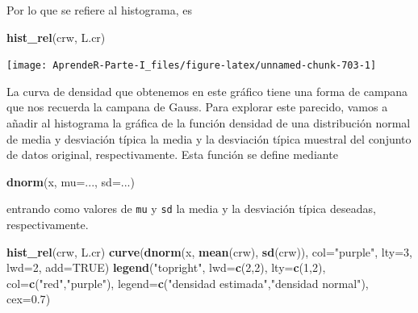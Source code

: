 \documentclass[]{book}
\newenvironment{Shaded}{\begin{snugshade}}{\end{snugshade}}
\newcommand{\DataTypeTok}[1]{\textcolor[rgb]{0.13,0.29,0.53}{#1}}
\newcommand{\DecValTok}[1]{\textcolor[rgb]{0.00,0.00,0.81}{#1}}
\newcommand{\FloatTok}[1]{\textcolor[rgb]{0.00,0.00,0.81}{#1}}
\newcommand{\KeywordTok}[1]{\textcolor[rgb]{0.13,0.29,0.53}{\textbf{#1}}}
\newcommand{\NormalTok}[1]{#1}
\newcommand{\OtherTok}[1]{\textcolor[rgb]{0.56,0.35,0.01}{#1}}
\newcommand{\StringTok}[1]{\textcolor[rgb]{0.31,0.60,0.02}{#1}}
\theoremstyle{definition}
\theoremstyle{definition}
\theoremstyle{definition}
\theoremstyle{remark}
\begin{document}
Por lo que se refiere al histograma, es

\begin{Shaded}
\begin{Highlighting}[]
\KeywordTok{hist_rel}\NormalTok{(crw, L.cr)}
\end{Highlighting}
\end{Shaded}

\begin{center}\texttt{[image: AprendeR-Parte-I\_files/figure-latex/unnamed-chunk-703-1]} \end{center}

La curva de densidad que obtenemos en este gráfico tiene una forma de campana que nos recuerda la campana de Gauss. Para explorar este parecido, vamos a añadir al histograma la gráfica de la función densidad de una distribución normal de media y desviación típica la media y la desviación típica muestral del conjunto de datos original, respectivamente. Esta función se define mediante

\begin{Shaded}
\begin{Highlighting}[]
\KeywordTok{dnorm}\NormalTok{(x, }\DataTypeTok{mu=}\NormalTok{..., }\DataTypeTok{sd=}\NormalTok{...)}
\end{Highlighting}
\end{Shaded}

entrando como valores de \texttt{mu} y \texttt{sd} la media y la desviación típica deseadas, respectivamente.

\begin{Shaded}
\begin{Highlighting}[]
\KeywordTok{hist_rel}\NormalTok{(crw, L.cr)}
\KeywordTok{curve}\NormalTok{(}\KeywordTok{dnorm}\NormalTok{(x, }\KeywordTok{mean}\NormalTok{(crw), }\KeywordTok{sd}\NormalTok{(crw)), }\DataTypeTok{col=}\StringTok{"purple"}\NormalTok{, }\DataTypeTok{lty=}\DecValTok{3}\NormalTok{, }\DataTypeTok{lwd=}\DecValTok{2}\NormalTok{, }\DataTypeTok{add=}\OtherTok{TRUE}\NormalTok{)}
\KeywordTok{legend}\NormalTok{(}\StringTok{"topright"}\NormalTok{, }\DataTypeTok{lwd=}\KeywordTok{c}\NormalTok{(}\DecValTok{2}\NormalTok{,}\DecValTok{2}\NormalTok{), }\DataTypeTok{lty=}\KeywordTok{c}\NormalTok{(}\DecValTok{1}\NormalTok{,}\DecValTok{2}\NormalTok{), }\DataTypeTok{col=}\KeywordTok{c}\NormalTok{(}\StringTok{"red"}\NormalTok{,}\StringTok{"purple"}\NormalTok{),}
  \DataTypeTok{legend=}\KeywordTok{c}\NormalTok{(}\StringTok{"densidad estimada"}\NormalTok{,}\StringTok{"densidad normal"}\NormalTok{), }\DataTypeTok{cex=}\FloatTok{0.7}\NormalTok{)}
\end{Highlighting}
\end{Shaded}
\end{document}
